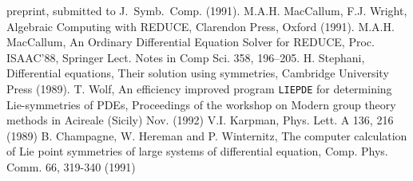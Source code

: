 \begin{thebibliography}{99}
preprint, submitted to J.\ Symb.\ Comp. (1991).
 M.A.H. MacCallum, F.J. Wright, Algebraic Computing with REDUCE,
Clarendon Press, Oxford (1991).
 M.A.H. MacCallum, An Ordinary Differential Equation
Solver for REDUCE, Proc. ISAAC'88, Springer Lect. Notes in Comp Sci.
358, 196--205.
 H. Stephani, Differential equations, Their solution using
symmetries, Cambridge University Press (1989).
 T. Wolf, An efficiency improved program {\tt LIEPDE}
for determining Lie-symmetries of PDEs, Proceedings of the workshop on
Modern group theory methods in Acireale (Sicily) Nov. (1992)
 V.I. Karpman, Phys. Lett. A 136, 216 (1989)
 B. Champagne, W. Hereman and P. Winternitz, The computer
      calculation of Lie point symmetries of large systems of differential
      equation, Comp. Phys. Comm. 66, 319-340 (1991)

\end{thebibliography}


